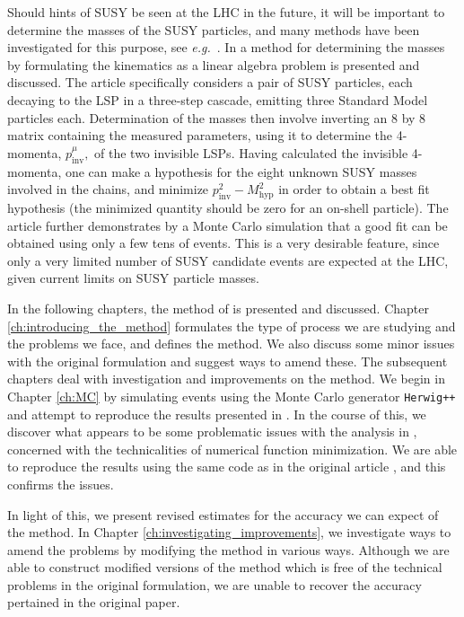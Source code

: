 \documentclass[twoside,english]{uiofysmaster}
\begin{document}
Should hints of SUSY be seen at the LHC in the future, it will be important to determine the masses of the SUSY particles, and many methods have been investigated for this purpose, see {\it e.g.}~\cite{Miller:2005zp}. In \cite{Webber:2009vm} a method for determining the masses by formulating the kinematics as a linear algebra problem is presented and discussed. The article specifically considers a pair of SUSY particles, each decaying to the LSP in a three-step cascade, emitting three Standard Model particles each. Determination of the masses then involve inverting an 8 by 8 matrix containing the measured parameters, using it to determine the 4-momenta, $p^\mu_\mathrm{inv},$ of the two invisible LSPs. Having calculated the invisible 4-momenta, one can make a hypothesis for the eight unknown SUSY masses involved in the chains, and minimize $p^2_\mathrm{inv}-M^2_\mathrm{hyp}$ in order to obtain a best fit hypothesis (the minimized quantity should be zero for an on-shell particle). The article further demonstrates by a Monte Carlo simulation that a good fit can be obtained using only a few tens of events. This is a very desirable feature, since only a very limited number of SUSY candidate events are  expected at the LHC, given current limits on SUSY particle masses.

 In the following chapters, the method of \cite{Webber:2009vm} is presented and discussed. Chapter \ref{ch:introducing_the_method} formulates the type of process we are studying and the problems we face, and defines the method. We also discuss some minor issues with the original formulation and suggest ways to amend these. The subsequent chapters deal with investigation and improvements on the method. We begin in Chapter \ref{ch:MC} by simulating events using the Monte Carlo generator {\tt Herwig++} and attempt to reproduce the results presented in \cite{Webber:2009vm}. In the course of this, we discover what appears to be some problematic issues with the analysis in \cite{Webber:2009vm}, concerned with the technicalities of numerical function minimization. We are able to reproduce the results using the same code as in the original article \cite{Webber:epost}, and this confirms the issues.

In light of this, we present revised estimates for the accuracy we can expect of the method. In Chapter \ref{ch:investigating_improvements}, we investigate ways to amend the problems by modifying the method in various ways. Although we are able to construct modified versions of the method which is free of the technical problems in the original formulation, we are unable to recover the accuracy pertained in the original paper.
\end{document}
